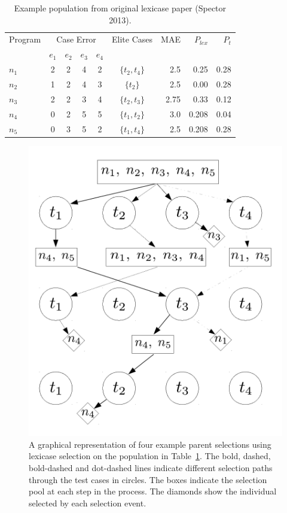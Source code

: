 \documentclass[twoside]{article}
\begin{document}
\begin{table}
\centering
\caption{Example population from original lexicase paper (Spector 2013).}\label{tbl:ex}
\begin{tabular}{l|cccc|c|r|rr}
Program & \multicolumn{4}{c}{Case Error} & Elite Cases & MAE & $P_{lex}$ & $P_{t}$\\
& $e_1$ & $e_2$ & $e_3$ & $e_4$ & \\ \hline
$n_1$ & 2 & 2 & 4 & 2 & $\{t_2,t_4\}$ &	2.5		&	0.25 	& 	0.28	\\
$n_2$ & 1 & 2 & 4 & 3 & $\{t_2\}$		&	2.5		&	0.00	&	0.28	\\
$n_3$ & 2 & 2 & 3 & 4 & $\{t_2,t_3\}$ &	2.75	& 	0.33	&	0.12	\\
$n_4$ & 0 & 2 & 5 & 5 & $\{t_1,t_2\}$ &	3.0		& 	0.208	&	0.04	\\
$n_5$ & 0 & 3 & 5 & 2 & $\{t_1,t_4\}$ &	2.5		&	0.208	&	0.28	\\ \bottomrule
\end{tabular}
\end{table}


\begin{figure}
\centering
  \includegraphics[height = 0.4\textheight]{figs/lex_graph.pdf}
  \caption{A graphical representation of four example parent selections using lexicase selection on the population in Table~\ref{tbl:ex}. The bold, dashed, bold-dashed and dot-dashed lines indicate different selection paths through the test cases in circles. The boxes indicate the selection pool at each step in the process. The diamonds show the individual selected by each selection event.}\label{fig:lex_graph}
\end{figure}
\end{document}
